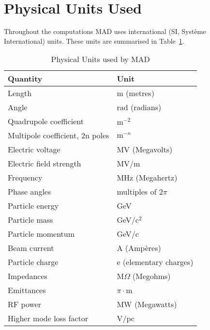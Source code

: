\section{Physical Units Used}
\label{S-PHYSUN}
Throughout the computations MAD uses international
(SI, Syst\`eme International) units.
These units are summarised in Table~\ref{T-UNIT}.
\begin{table}[ht]
\label{T-UNIT}
\caption{Physical Units used by MAD}
\vspace{1ex}
\centering
\begin{tabular}{|l|l|}
\hline
Quantity &Unit \\
\hline
\index{length}
\index{angle}
\index{quadrupole}
\index{multipole}
\index{voltage}
\index{field}
\index{electric field}
\index{frequency}
\index{RF}
\index{energy}
\index{mass}
\index{momentum}
\index{current}
\index{charge}
\index{impedance}
\index{emittance}
\index{power}
\index{high order modes}
Length &m (metres) \\
Angle &rad (radians) \\
Quadrupole coefficient &\(\mathrm{m}^{-2}\) \\
Multipole coefficient, 2n poles &\(\mathrm{m}^{-n}\) \\
Electric voltage &MV (Megavolts) \\
Electric field strength &MV/m \\
Frequency &MHz (Megahertz) \\
Phase angles &multiples of \(2\pi\) \\
Particle energy &GeV \\
Particle mass &GeV/c\({}^2\) \\
Particle momentum &GeV/c \\
Beam current &A (Amp\`eres) \\
Particle charge &e (elementary charges) \\
Impedances &M\(\Omega\) (Megohms) \\
Emittances &\(\pi\cdot\)m \\
RF power &MW (Megawatts) \\
Higher mode loss factor &V/pc \\
\hline
\end{tabular}
\end{table}
 
